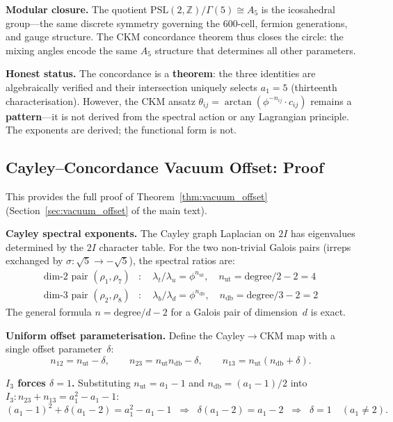 \documentclass[12pt,a4paper]{article}
\theoremstyle{definition}
\begin{document}
\textbf{Modular closure.}  The quotient $\mathrm{PSL}(2,\mathbb{Z})/\Gamma(5) \cong A_5$ is the icosahedral group---the same discrete symmetry governing the 600-cell, fermion generations, and gauge structure.  The CKM concordance theorem thus closes the circle: the mixing angles encode the same $A_5$ structure that determines all other parameters.

\textbf{Honest status.}  The concordance is a \textbf{theorem}: the three identities are algebraically verified and their intersection uniquely selects $a_1 = 5$ (thirteenth characterisation).  However, the CKM ansatz $\theta_{ij} = \arctan(\phi^{-n_{ij}} \cdot c_{ij})$ remains a \textbf{pattern}---it is not derived from the spectral action or any Lagrangian principle.  The exponents are derived; the functional form is not.

\subsection{Cayley--Concordance Vacuum Offset: Proof}
\label{sec:S-vacuum-offset}

This provides the full proof of Theorem~\ref{thm:vacuum_offset} (Section~\ref{sec:vacuum_offset} of the main text).

\textbf{Cayley spectral exponents.}  The Cayley graph Laplacian on $2I$ has eigenvalues determined by the $2I$ character table.  For the two non-trivial Galois pairs (irreps exchanged by $\sigma\colon \sqrt{5} \to -\sqrt{5}$), the spectral ratios are:
\begin{align}
\text{dim-2 pair } (\rho_1, \rho_7)&\colon \quad \lambda_t / \lambda_u = \phi^{n_{\text{ut}}}, \quad n_{\text{ut}} = \text{degree}/2 - 2 = 4 \\
\text{dim-3 pair } (\rho_2, \rho_8)&\colon \quad \lambda_b / \lambda_d = \phi^{n_{\text{db}}}, \quad n_{\text{db}} = \text{degree}/3 - 2 = 2
\end{align}
The general formula $n = \text{degree}/d - 2$ for a Galois pair of dimension~$d$ is exact.

\textbf{Uniform offset parameterisation.}  Define the Cayley$\to$CKM map with a single offset parameter~$\delta$:
\[
n_{12} = n_{\text{ut}} - \delta, \qquad n_{23} = n_{\text{ut}} n_{\text{db}} - \delta, \qquad n_{13} = n_{\text{ut}}(n_{\text{db}} + \delta).
\]

\textbf{$I_3$ forces $\delta = 1$.}  Substituting $n_{\text{ut}} = a_1 - 1$ and $n_{\text{db}} = (a_1-1)/2$ into $I_3\colon n_{23} + n_{13} = a_1^2 - a_1 - 1$:
\[
(a_1-1)^2 + \delta(a_1-2) = a_1^2 - a_1 - 1 \;\;\Longrightarrow\;\; \delta(a_1-2) = a_1-2 \;\;\Longrightarrow\;\; \delta = 1 \quad (a_1 \neq 2).
\]
\end{document}
